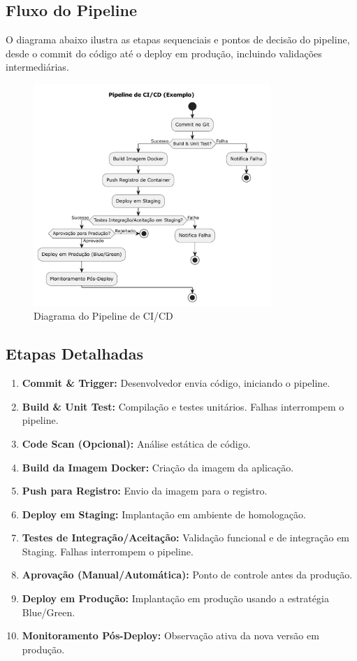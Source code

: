 \subsection{Fluxo do Pipeline}
\label{subsec:cicd-fluxo}
O diagrama abaixo ilustra as etapas sequenciais e pontos de decisão do pipeline, desde o commit do código até o deploy em produção, incluindo validações intermediárias.

\begin{figure}[htbp]
    \centering
    \includegraphics[width=0.8\textwidth]{assets/diagrama-cicd.pdf}
    \caption{Diagrama do Pipeline de CI/CD}
    \label{fig:diagrama-cicd}
\end{figure}

\subsection{Etapas Detalhadas}
\label{subsec:cicd-etapas}
\begin{enumerate}
    \item \textbf{Commit \& Trigger:} Desenvolvedor envia código, iniciando o pipeline.
    \item \textbf{Build \& Unit Test:} Compilação e testes unitários. Falhas interrompem o pipeline.
    \item \textbf{Code Scan (Opcional):} Análise estática de código.
    \item \textbf{Build da Imagem Docker:} Criação da imagem da aplicação.
    \item \textbf{Push para Registro:} Envio da imagem para o registro.
    \item \textbf{Deploy em Staging:} Implantação em ambiente de homologação.
    \item \textbf{Testes de Integração/Aceitação:} Validação funcional e de integração em Staging. Falhas interrompem o pipeline.
    \item \textbf{Aprovação (Manual/Automática):} Ponto de controle antes da produção.
    \item \textbf{Deploy em Produção:} Implantação em produção usando a estratégia Blue/Green.
    \item \textbf{Monitoramento Pós-Deploy:} Observação ativa da nova versão em produção.
\end{enumerate}

